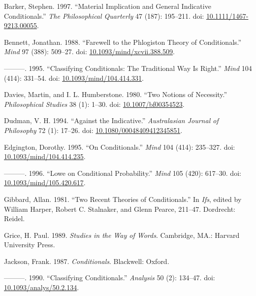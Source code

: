 \documentclass[
  11pt,
  letterpaper,
  DIV=11,
  numbers=noendperiod,
  twoside]{scrartcl}
\newlength{\cslhangindent}
\newenvironment{CSLReferences}[2] %
 {\begin{list}{}{%
  \setlength{\itemindent}{0pt}
  \setlength{\leftmargin}{0pt}
  \setlength{\parsep}{0pt}
  \ifodd #1
   \setlength{\leftmargin}{\cslhangindent}
   \setlength{\itemindent}{-1\cslhangindent}
  \fi
  \setlength{\itemsep}{#2\baselineskip}}}
 {\end{list}}
\begin{document}
\label{refs}
\begin{CSLReferences}{1}{0}
Barker, Stephen. 1997. {``Material Implication and General Indicative
Conditionals.''} \emph{The Philosophical Quarterly} 47 (187): 195--211.
doi:
\href{https://doi.org/10.1111/1467-9213.00055}{10.1111/1467-9213.00055}.

Bennett, Jonathan. 1988. {``Farewell to the Phlogiston Theory of
Conditionals.''} \emph{Mind} 97 (388): 509--27. doi:
\href{https://doi.org/10.1093/mind/xcvii.388.509}{10.1093/mind/xcvii.388.509}.

---------. 1995. {``Classifying Conditionals: The Traditional Way Is
Right.''} \emph{Mind} 104 (414): 331--54. doi:
\href{https://doi.org/10.1093/mind/104.414.331}{10.1093/mind/104.414.331}.

Davies, Martin, and I. L. Humberstone. 1980. {``Two Notions of
Necessity.''} \emph{Philosophical Studies} 38 (1): 1--30. doi:
\href{https://doi.org/10.1007/bf00354523}{10.1007/bf00354523}.

Dudman, V. H. 1994. {``Against the Indicative.''} \emph{Australasian
Journal of Philosophy} 72 (1): 17--26. doi:
\href{https://doi.org/10.1080/00048409412345851}{10.1080/00048409412345851}.

Edgington, Dorothy. 1995. {``On Conditionals.''} \emph{Mind} 104 (414):
235--327. doi:
\href{https://doi.org/10.1093/mind/104.414.235}{10.1093/mind/104.414.235}.

---------. 1996. {``Lowe on Conditional Probability.''} \emph{Mind} 105
(420): 617--30. doi:
\href{https://doi.org/10.1093/mind/105.420.617}{10.1093/mind/105.420.617}.

Gibbard, Allan. 1981. {``Two Recent Theories of Conditionals.''} In
\emph{Ifs}, edited by William Harper, Robert C. Stalnaker, and Glenn
Pearce, 211--47. Dordrecht: Reidel.

Grice, H. Paul. 1989. \emph{Studies in the Way of Words}. Cambridge,
MA.: Harvard University Press.

Jackson, Frank. 1987. \emph{Conditionals}. Blackwell: Oxford.

---------. 1990. {``Classifying Conditionals.''} \emph{Analysis} 50 (2):
134--47. doi:
\href{https://doi.org/10.1093/analys/50.2.134}{10.1093/analys/50.2.134}.


\end{CSLReferences}
\end{document}
